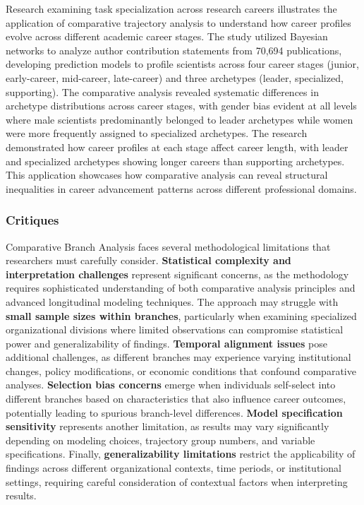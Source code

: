 \documentclass[main.tex]{subfiles}
\begin{document}

Research examining task specialization across research careers illustrates the application of comparative trajectory analysis to understand how career profiles evolve across different academic career stages\parencite{Senger2020}. The study utilized Bayesian networks to analyze author contribution statements from 70,694 publications, developing prediction models to profile scientists across four career stages (junior, early-career, mid-career, late-career) and three archetypes (leader, specialized, supporting). The comparative analysis revealed systematic differences in archetype distributions across career stages, with gender bias evident at all levels where male scientists predominantly belonged to leader archetypes while women were more frequently assigned to specialized archetypes. The research demonstrated how career profiles at each stage affect career length, with leader and specialized archetypes showing longer careers than supporting archetypes. This application showcases how comparative analysis can reveal structural inequalities in career advancement patterns across different professional domains.

\subsubsection{Critiques}

Comparative Branch Analysis faces several methodological limitations that researchers must carefully consider. \textbf{Statistical complexity and interpretation challenges} represent significant concerns, as the methodology requires sophisticated understanding of both comparative analysis principles and advanced longitudinal modeling techniques\parencite{MOOCGBTM, Cheng2022}. The approach may struggle with \textbf{small sample sizes within branches}, particularly when examining specialized organizational divisions where limited observations can compromise statistical power and generalizability of findings\parencite{Jones2001}. \textbf{Temporal alignment issues} pose additional challenges, as different branches may experience varying institutional changes, policy modifications, or economic conditions that confound comparative analyses\parencite{Cheng2022}. \textbf{Selection bias concerns} emerge when individuals self-select into different branches based on characteristics that also influence career outcomes, potentially leading to spurious branch-level differences\parencite{Senger2020}. \textbf{Model specification sensitivity} represents another limitation, as results may vary significantly depending on modeling choices, trajectory group numbers, and variable specifications\parencite{MOOCGBTM, Jones2001}. Finally, \textbf{generalizability limitations} restrict the applicability of findings across different organizational contexts, time periods, or institutional settings, requiring careful consideration of contextual factors when interpreting results\parencite{Wienclaw2021, Cheng2022}.
\end{document}
